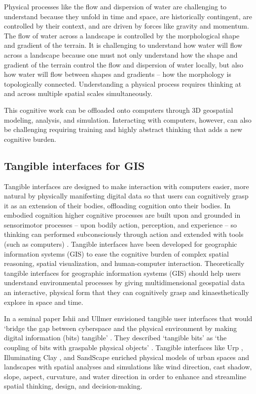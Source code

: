 \documentclass{isprs}
\begin{document}
Physical processes like the flow and dispersion of water are challenging to understand because they unfold in time and space, are historically contingent, are controlled by their context, and are driven by forces like gravity and momentum. The flow of water across a landscape is controlled by the morphological shape and gradient of the terrain. It is challenging to understand how water will flow across a landscape because one must not only understand how the shape and gradient of the terrain control the flow and dispersion of water locally, but also how water will flow between shapes and gradients – how the morphology is topologically connected. Understanding a physical process requires thinking at and across multiple spatial scales simultaneously. 

This cognitive work can be offloaded onto computers through 3D geospatial modeling, analysis, and simulation. Interacting with computers, however, can also be challenging requiring training and highly abstract thinking that adds a new cognitive burden.


\subsection{Tangible interfaces for GIS}
%
Tangible interfaces are designed to make interaction with computers easier, more natural
by physically manifesting digital data so that users can cognitively grasp it as an extension of their bodies, offloading cognition onto their bodies. 
%
In embodied cognition higher cognitive processes are built upon and grounded in sensorimotor processes -- upon bodily action, perception, and experience -- 
so thinking can performed subconsciously through action and extended with tools (such as computers) \cite{Kirsh2013}.
%
Tangible interfaces have been developed for geographic information systems (GIS) to ease the cognitive burden of complex spatial reasoning, spatial visualization, and human-computer interaction. 
%
Theoretically tangible interfaces for geographic information systems (GIS) should help users understand environmental processes
by giving multidimensional geospatial data an interactive, physical form 
that they can cognitively grasp and kinaesthetically explore in space and time. 

In a seminal paper Ishii and Ullmer envisioned tangible user interfaces that would 
`bridge the gap between cyberspace and the physical environment by making digital information (bits) tangible' \cite{Ishii1997}.
They described `tangible bits' as `the coupling of bits with graspable physical objects' \cite{Ishii1997}. 
Tangible interfaces like 
Urp \cite{Underkoffler1999}, Illuminating Clay \cite{Piper2002}, and SandScape \cite{Ratti2004} 
enriched physical models of urban spaces and landscapes with spatial analyses and simulations 
like wind direction, cast shadow, slope, aspect, curvature, and water direction
in order to enhance and streamline spatial thinking, design, and decision-making.
\end{document}
